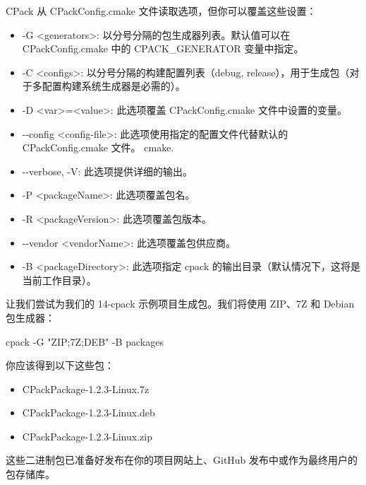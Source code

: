 CPack 从 CPackConfig.cmake 文件读取选项，但你可以覆盖这些设置：

\begin{itemize}
\item
-G <generators>: 以分号分隔的包生成器列表。默认值可以在 CPackConfig.cmake 中的 CPACK\_GENERATOR 变量中指定。

\item
-C <configs>: 以分号分隔的构建配置列表（debug, release），用于生成包（对于多配置构建系统生成器是必需的）。

\item
-D <var>=<value>: 此选项覆盖 CPackConfig.cmake 文件中设置的变量。

\item
-{}-config <config-file>: 此选项使用指定的配置文件代替默认的 CPackConfig.cmake 文件。
cmake.

\item
-{}-verbose, -V: 此选项提供详细的输出。

\item
-P <packageName>: 此选项覆盖包名。

\item
-R <packageVersion>: 此选项覆盖包版本。

\item
-{}-vendor <vendorName>: 此选项覆盖包供应商。

\item
-B <packageDirectory>: 此选项指定 cpack 的输出目录（默认情况下，这将是当前工作目录）。
\end{itemize}

让我们尝试为我们的 14-cpack 示例项目生成包。我们将使用 ZIP、7Z 和 Debian 包生成器：

\begin{shell}
cpack -G "ZIP;7Z;DEB" -B packages
\end{shell}

你应该得到以下这些包：

\begin{itemize}
\item
CPackPackage-1.2.3-Linux.7z

\item
CPackPackage-1.2.3-Linux.deb

\item
CPackPackage-1.2.3-Linux.zip
\end{itemize}

这些二进制包已准备好发布在你的项目网站上、GitHub 发布中或作为最终用户的包存储库。
